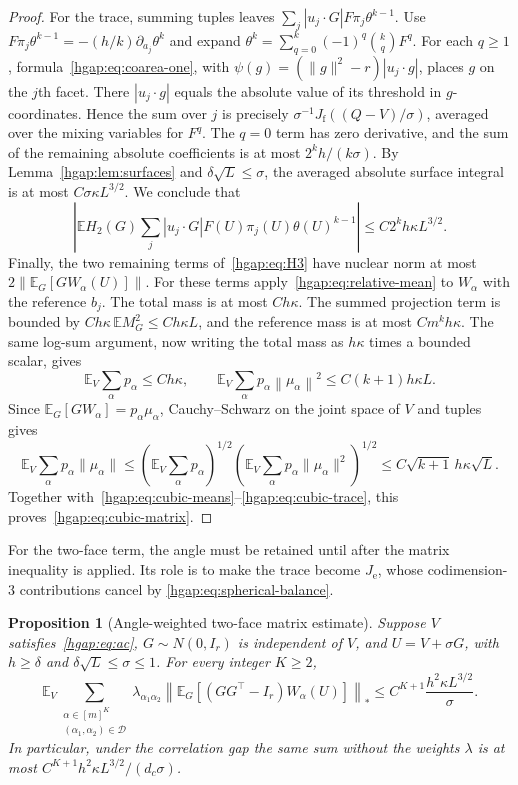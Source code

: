 \documentclass[11pt,letterpaper]{article}
\newtheorem{proposition}{Proposition}
\theoremstyle{remark}
\newcommand{\E}{\mathbb E}
\newcommand{\cD}{\mathcal D}
\newcommand{\norm}[1]{\left\lVert#1\right\rVert}
\begin{document}
\begin{proof}
For the trace, summing tuples leaves
$\sum_j|u_j\cdot G|F\pi_j\theta^{k-1}$.
Use
$F\pi_j\theta^{k-1}=-(h/k)\partial_{a_j}\theta^k$ and expand
$\theta^k=\sum_{q=0}^k(-1)^q\binom{k}{q}F^q$.
For each $q\ge1$, formula~\eqref{hgap:eq:coarea-one}, with
$\psi(g)=(\|g\|^2-r)|u_j\cdot g|$, places $g$ on the $j$th facet.
There $|u_j\cdot g|$ equals the absolute value of its threshold in
$g$-coordinates. Hence the sum over $j$ is precisely
$\sigma^{-1}J_{\mathrm f}((Q-V)/\sigma)$, averaged over the mixing
variables for $F^q$. The $q=0$ term has zero derivative, and the sum
of the remaining absolute coefficients is at most $2^kh/(k\sigma)$.
By Lemma~\ref{hgap:lem:surfaces} and
$\delta\sqrt L\le\sigma$, the averaged absolute surface integral is
at most $C\sigma\kappa L^{3/2}$. We conclude that
\begin{equation}
 \left|\E H_2(G)\sum_j|u_j\cdot G|F(U)\pi_j(U)\theta(U)^{k-1}\right|
 \le C2^kh\kappa L^{3/2}.
 \label{hgap:eq:cubic-trace}
\end{equation}
Finally, the two remaining terms of~\eqref{hgap:eq:H3} have nuclear norm
at most $2\norm{\E_G[G W_\alpha(U)]}$.
For these terms apply~\eqref{hgap:eq:relative-mean} to $W_\alpha$
with the reference $b_j$. The total mass is at most $Ch\kappa$.
The summed projection term is bounded by
$Ch\kappa\,\E M_G^2\le Ch\kappa L$, and the reference mass is at
most $Cm^kh\kappa$. The same log-sum argument, now writing the
total mass as $h\kappa$ times a bounded scalar, gives
\[
 \E_V\sum_\alpha p_\alpha\le Ch\kappa,\qquad
 \E_V\sum_\alpha p_\alpha\norm{\mu_\alpha}^2
 \le C(k+1)h\kappa L.
\]
Since $\E_G[GW_\alpha]=p_\alpha\mu_\alpha$, Cauchy--Schwarz on the
joint space of $V$ and tuples gives
\[
 \E_V\sum_\alpha p_\alpha\|\mu_\alpha\|
 \le\left(\E_V\sum_\alpha p_\alpha\right)^{1/2}
      \left(\E_V\sum_\alpha p_\alpha\|\mu_\alpha\|^2\right)^{1/2}
 \le C\sqrt{k+1}\,h\kappa\sqrt L.
\]
Together with~\eqref{hgap:eq:cubic-means}--\eqref{hgap:eq:cubic-trace}, this
proves~\eqref{hgap:eq:cubic-matrix}.
\end{proof}

For the two-face term, the angle must be retained until after the
matrix inequality is applied. Its role is to make the trace become
$J_{\mathrm e}$, whose codimension-$3$ contributions cancel by
\eqref{hgap:eq:spherical-balance}.

\begin{proposition}[Angle-weighted two-face matrix estimate]\label{hgap:prop:pair}
Suppose $V$ satisfies~\eqref{hgap:eq:ac}, $G\sim N(0,I_r)$ is
independent of $V$, and $U=V+\sigma G$, with
$h\ge\delta$ and $\delta\sqrt L\le\sigma\le1$.
For every integer $K\ge2$,
\begin{equation}
 \E_V\sum_{\substack{\alpha\in[m]^K\\(\alpha_1,\alpha_2)\in\cD}}
 \lambda_{\alpha_1\alpha_2}
 \left\|\E_G[(GG^\top-I_r)W_\alpha(U)]\right\|_*
 \le C^{K+1}\frac{h^2\kappa L^{3/2}}{\sigma}.
 \label{hgap:eq:weighted-pair-matrix}
\end{equation}
In particular, under the correlation gap the same sum without the
weights $\lambda$ is at most $C^{K+1}h^2\kappa L^{3/2}/(d_c\sigma)$.
\end{proposition}
\end{document}
